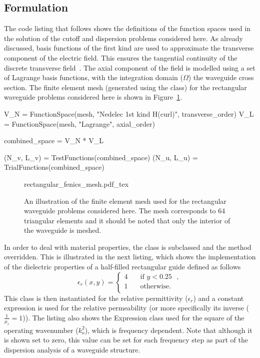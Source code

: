 \subsection{Formulation}

The code listing that follows shows the definitions of the function
spaces used in the solution of the cutoff and dispersion problems
considered here. As already discussed, \nedelec{} basis functions of
the first kind are used to approximate the transverse component of the
electric field. This ensures the tangential continuity of the discrete
transverse field~\citep{Jin2002}.  The axial component of the field is
modelled using a set of Lagrange basis functions, with the integration
domain ($\Omega$) the waveguide cross section. The finite element mesh
(generated using the \dolfin{}  class) for the
rectangular waveguide problems considered here is shown in
Figure~\ref{fig:lezar:rectangular_fenics_mesh}.
\begin{python}
V_N = FunctionSpace(mesh, "Nedelec 1st kind H(curl)", transverse_order)
V_L = FunctionSpace(mesh, "Lagrange", axial_order)

combined_space = V_N * V_L

(N_v, L_v) = TestFunctions(combined_space)
(N_u, L_u) = TrialFunctions(combined_space)
\end{python}

\begin{figure}
  \centering
    \def\svgwidth{\smallfig}
  {rectangular_fenics_mesh.pdf_tex}
  \caption{An illustration of the finite element mesh used for the
  rectangular waveguide problems considered here. The mesh corresponds
  to 64 triangular elements and it should be noted that only the interior
  of the waveguide is meshed.}
  \label{fig:lezar:rectangular_fenics_mesh}
\end{figure}

In order to deal with material properties, the  class
is subclassed and the  method overridden. This is illustrated
in the next listing, which shows the implementation of the dielectric
properties of a half-filled rectangular guide defined as follows
\begin{equation}
\label{eq:lezar:half_filled_dielectric}
\epsilon_r (x,y) =
\begin{cases}
  4\quad &\text{if $y < 0.25$ },\\
  1\quad &\text{otherwise}.\\
\end{cases}
\end{equation}
This class is then instantiated for the relative permittivity
($\epsilon_r$) and a constant expression is used for the relative
permeability (or more specifically its inverse ($\frac{1}{\mu_r}
= 1$)). The listing also shows the Expression class used for the
square of the operating wavenumber ($k_o^2$), which is frequency
dependent. Note that although it is shown set to zero, this value can
be set for each frequency step as part of the dispersion analysis of a
waveguide structure.


